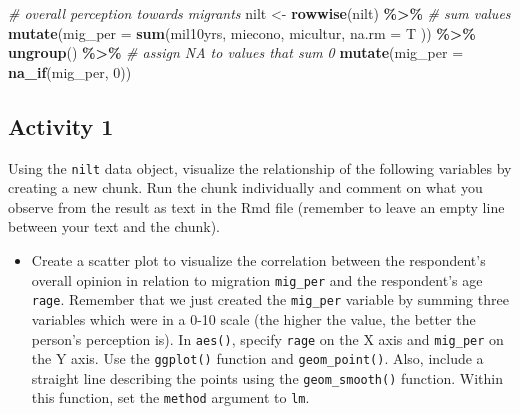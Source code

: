 \documentclass[
]{book}
\newenvironment{Shaded}{\begin{snugshade}}{\end{snugshade}}
\newcommand{\AttributeTok}[1]{\textcolor[rgb]{0.13,0.29,0.53}{#1}}
\newcommand{\CommentTok}[1]{\textcolor[rgb]{0.56,0.35,0.01}{\textit{#1}}}
\newcommand{\DecValTok}[1]{\textcolor[rgb]{0.00,0.00,0.81}{#1}}
\newcommand{\FunctionTok}[1]{\textcolor[rgb]{0.13,0.29,0.53}{\textbf{#1}}}
\newcommand{\NormalTok}[1]{#1}
\newcommand{\OtherTok}[1]{\textcolor[rgb]{0.56,0.35,0.01}{#1}}
\newcommand{\SpecialCharTok}[1]{\textcolor[rgb]{0.81,0.36,0.00}{\textbf{#1}}}
\providecommand{\tightlist}{%
  \setlength{\itemsep}{0pt}\setlength{\parskip}{0pt}}
\begin{document}
\begin{Shaded}
\begin{Highlighting}[]
\CommentTok{\# overall perception towards migrants}
\NormalTok{nilt }\OtherTok{\textless{}{-}} \FunctionTok{rowwise}\NormalTok{(nilt) }\SpecialCharTok{\%\textgreater{}\%} 
  \CommentTok{\# sum values}
  \FunctionTok{mutate}\NormalTok{(}\AttributeTok{mig\_per =} \FunctionTok{sum}\NormalTok{(mil10yrs, miecono, micultur, }\AttributeTok{na.rm =}\NormalTok{ T )) }\SpecialCharTok{\%\textgreater{}\%} 
  \FunctionTok{ungroup}\NormalTok{() }\SpecialCharTok{\%\textgreater{}\%} 
  \CommentTok{\# assign NA to values that sum 0}
  \FunctionTok{mutate}\NormalTok{(}\AttributeTok{mig\_per =}  \FunctionTok{na\_if}\NormalTok{(mig\_per, }\DecValTok{0}\NormalTok{))}
\end{Highlighting}
\end{Shaded}

\hypertarget{activity-1-5}{%
\subsection{Activity 1}\label{activity-1-5}}

Using the \texttt{nilt} data object, visualize the relationship of the following variables by creating a new chunk. Run the chunk individually and comment on what you observe from the result as text in the Rmd file (remember to leave an empty line between your text and the chunk).

\begin{itemize}
\tightlist
\item
  Create a scatter plot to visualize the correlation between the respondent's overall opinion in relation to migration \texttt{mig\_per} and the respondent's age \texttt{rage}. Remember that we just created the \texttt{mig\_per} variable by summing three variables which were in a 0-10 scale (the higher the value, the better the person's perception is). In \texttt{aes()}, specify \texttt{rage} on the X axis and \texttt{mig\_per} on the Y axis. Use the \texttt{ggplot()} function and \texttt{geom\_point()}. Also, include a straight line describing the points using the \texttt{geom\_smooth()} function. Within this function, set the \texttt{method} argument to \texttt{\textquotesingle{}lm\textquotesingle{}}.
\end{itemize}
\end{document}
